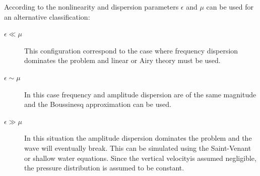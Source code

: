 According to \cite{ursell1953} the nonlinearity and dispersion parameters $\epsilon$ and $\mu$ can be used for an alternative classification:

\begin{description}
    \item[$\epsilon \ll \mu$]  This configuration correspond to the case where frequency dispersion dominates the problem and linear or Airy theory must be used.
    \item[$\epsilon \sim \mu$] In this case frequency and amplitude dispersion are of the same magnitude and the Boussinesq approximation can be used.
    \item[$\epsilon \gg \mu$] In this situation the amplitude dispersion dominates the problem and the wave will eventually break. This can be simulated using the Saint-Venant or shallow water equations. Since the vertical velocityis assumed negligible, the pressure distribution is assumed to be constant.
\end{description}








